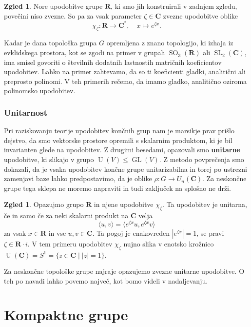 \documentclass[11pt]{book}
\def\RR{\mathbf{R}}
\def\CC{\mathbf{C}}
\DeclareMathOperator\GL{GL}
\DeclareMathOperator\U{U}
\DeclareMathOperator\SL{SL}
\DeclareMathOperator\SO{SO}
\def\definicija{\color{rdeca}\bf}
\theoremstyle{definition}
\theoremstyle{zgled}
\newtheorem{zgled}[theorem]{Zgled}
\theoremstyle{zgledbrezstevilke}
\theoremstyle{odprtproblem}
\theoremstyle{domacanaloga}
\theoremstyle{izrek}
\begin{document}
\begin{zgled}
Nore upodobitve grupe $\RR$, ki smo jih konstruirali v zadnjem zgledu, povečini niso zvezne. So pa za vsak parameter $\zeta \in \CC$ zvezne upodobitve oblike
\[
    \chi_{\zeta} \colon \RR \to \CC^*, \quad
    x \mapsto e^{\zeta x}.
\]
\end{zgled}

Kadar je dana topološka grupa $G$ opremljena z znano topologijo, ki izhaja iz evklidskega prostora, kot se zgodi na primer v grupah $\SO_3(\RR)$ ali $\SL_2(\CC)$, ima smisel govoriti o številnih dodatnih lastnostih matričnih koeficientov upodobitev. Lahko na primer zahtevamo, da so ti koeficienti gladki, analitični ali preprosto polinomi. V teh primerih rečemo, da imamo gladko, analitično oziroma polinomsko upodobitev.

\subsubsection{Unitarnost}

Pri raziskovanju teorije upodobitev končnih grup nam je marsikje prav prišlo dejstvo, da smo vektorske prostore opremili s skalarnim produktom, ki je bil invarianten glede na upodobitev. Z drugimi besedami, opazovali smo {\definicija unitarne} upodobitve, ki slikajo v grupo $\U(V) \leq \GL(V)$. Z metodo povprečenja smo dokazali, da je vsaka upodobitev končne grupe unitarizabilna in torej po ustrezni zamenjavi baze lahko predpostavimo, da je oblike $\rho \colon G \to U_n(\CC)$. Za neskončne grupe tega sklepa ne moremo napraviti in tudi zaključek na splošno ne drži.

\begin{zgled}
Opazujmo grupo $\RR$ in njene upodobitve $\chi_{\zeta}$. Ta upodobitev je unitarna, če in samo če za neki skalarni produkt na $\CC$ velja
\[
    \langle u, v \rangle = \langle e^{\zeta x} u, e^{\zeta x} v \rangle
\]
za vsak $x \in \RR$ in vse $u,v \in \CC$. Ta pogoj je enakovreden $|e^{\zeta x}| = 1$, se pravi $\zeta \in \RR \cdot i$. V tem primeru upodobitev $\chi_{\zeta}$ nujno slika v enotsko krožnico $\U(\CC) = S^1 = \{ z \in \CC \mid |z| = 1 \}$.
\end{zgled}

Za neskončne topološke grupe najraje opazujemo zvezne unitarne upodobitve. O teh po navadi lahko povemo največ, kot bomo videli v nadaljevanju.

\section{Kompaktne grupe}
\end{document}
